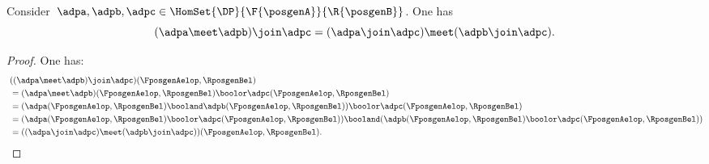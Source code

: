\begin{lemma}
    \label{lem:vee_wedge}
    Consider~$\adpa,\adpb,\adpc\in \HomSet{\DP}{\F{\posgenA}}{\R{\posgenB}}$.
    One has
    \begin{equation*}
        (\adpa \meet \adpb)
        \join \adpc=(\adpa \join \adpc) \meet (\adpb\join \adpc).
    \end{equation*}
\end{lemma}
\begin{proof}
    One has:
    \begin{equation*}
        \begin{aligned}
            ~ & ((\adpa \meet \adpb)\join \adpc)(\FposgenAelop,\RposgenBel)                                                                                                       \\
              & =
            (\adpa \meet \adpb)(\FposgenAelop,\RposgenBel)\boolor \adpc(\FposgenAelop,\RposgenBel)                                                                                \\
              & =(\adpa(\FposgenAelop,\RposgenBel) \booland \adpb(\FposgenAelop,\RposgenBel))\boolor \adpc(\FposgenAelop,\RposgenBel)                                             \\
              & =(\adpa(\FposgenAelop,\RposgenBel) \boolor  \adpc(\FposgenAelop,\RposgenBel)) \booland (\adpb(\FposgenAelop,\RposgenBel)\boolor \adpc(\FposgenAelop,\RposgenBel)) \\
              & =((\adpa \join \adpc) \meet (\adpb\join \adpc))(\FposgenAelop,\RposgenBel).
        \end{aligned}
    \end{equation*}
\end{proof}

